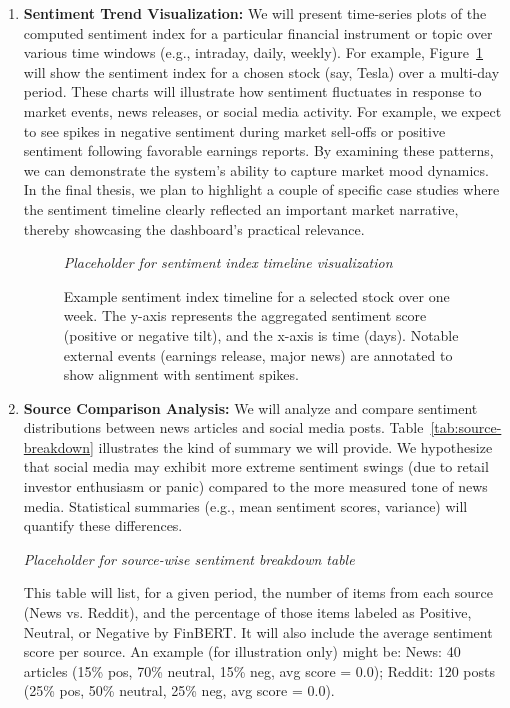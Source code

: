 \documentclass[12pt]{article}
\begin{document}
\begin{enumerate}
  \item \textbf{Sentiment Trend Visualization:} We will present time-series plots of the computed sentiment
        index for a particular financial instrument or topic over various time windows (e.g., intraday,
        daily, weekly). For example, Figure~\ref{fig:timeline} will show the sentiment index for a chosen
        stock (say, Tesla) over a multi-day period. These charts will illustrate how sentiment fluctuates in
        response to market events, news releases, or social media activity. For example, we expect to see
        spikes in negative sentiment during market sell-offs or positive sentiment following favorable
        earnings reports. By examining these patterns, we can demonstrate the system's ability to capture
        market mood dynamics. In the final thesis, we plan to highlight a couple of specific case studies
        where the sentiment timeline clearly reflected an important market narrative, thereby showcasing the
        dashboard's practical relevance.

        \begin{figure}[h!]
          \centering
          \textit{Placeholder for sentiment index timeline visualization}
          \caption{Example sentiment index timeline for a selected stock over one week. The y-axis
            represents the aggregated sentiment score (positive or negative tilt), and the x-axis is time
            (days). Notable external events (earnings release, major news) are annotated to show alignment
            with sentiment spikes.}
          \label{fig:timeline}
        \end{figure}

  \item \textbf{Source Comparison Analysis:} We will analyze and compare sentiment distributions
        between news articles and social media posts. Table~\ref{tab:source-breakdown} illustrates the kind
        of summary we will provide. We hypothesize that social media may exhibit more extreme sentiment
        swings (due to retail investor enthusiasm or panic) compared to the more measured tone of news media.
        Statistical summaries (e.g., mean sentiment scores, variance) will quantify these differences.

        \begin{table}[h!]
          \centering
          \textit{Placeholder for source-wise sentiment breakdown table}
          \caption{This table will list, for a given period, the number of items from each source (News vs. Reddit),
          and the percentage of those items labeled as Positive, Neutral, or Negative by FinBERT. It will
          also include the average sentiment score per source. An example (for illustration only) might be:
          {\small News: 40 articles (15\% pos, 70\% neutral, 15\% neg, avg score = 0.0); Reddit: 120 posts
          (25\% pos, 50\% neutral, 25\% neg, avg score = 0.0).}}
          \label{tab:source-breakdown}
        \end{table}


\end{enumerate}
\end{document}
